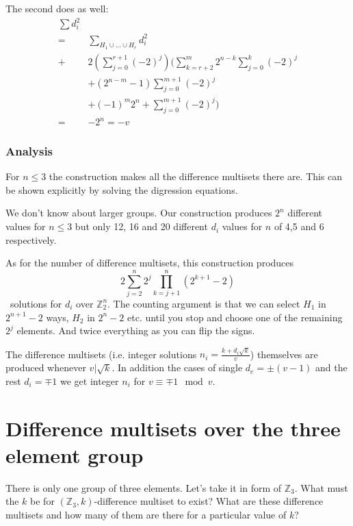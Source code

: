         The second does as well:
        \begin{equation}
            \begin{split}
                \sum d_i^2 & \\
                = & \sum\limits_{H_1 \cup \ldots \cup H_r} d_i^2 \\
                + & 2 \left(\sum\limits_{j=0}^{r+1} (-2)^j \right) 
                 \Bigg(
                    \sum\limits_{k=r+2}^{m} 2^{n-k} \sum\limits_{j=0}^k (-2)^j \\
                   & + (2^{n-m}-1)\sum\limits_{j=0}^{m+1} (-2)^j \\
                   & + (-1)^m 2^n + \sum\limits_{j=0}^{m+1} (-2)^j
                 \Bigg) \\
                = & - 2^n = -v
            \end{split}
        \end{equation}
    
    \subsubsection{Analysis}
        For $n \leq 3$ the construction makes all the difference multisets there are. This can be shown explicitly by solving the digression equations.
        
        We don't know about larger groups. Our construction produces $2^n$ different values for $n \leq 3$ but only 12, 16 and 20 different $d_i$ values for $n$ of 4,5 and 6 respectively.
        
        As for the number of difference multisets, this construction produces
        \begin{equation}
            2 \sum\limits_{j=2}^n 2^j \prod\limits_{k=j+1}^n (2^{k+1}-2)
        \end{equation}\
        solutions for $d_i$ over $\mathbb Z_2^n$. The counting argument is that we can select $H_1$ in $2^{n+1}-2$ ways, $H_2$ in $2^n-2$ etc. until you stop and choose one of the remaining $2^j$ elements. And twice everything as you can flip the signs.
        
        The difference multisets (i.e. integer solutions $n_i=\frac{k+d_i \sqrt k}v$) themselves are produced whenever $v | \sqrt k$. In addition the cases of single $d_e = \pm (v-1)$ and the rest $d_i = \mp 1$ we get integer $n_i$ for $v \equiv \mp 1 \mod v$.
        
\section{Difference multisets over the three element group}
    \label{sec:z3}
    There is only one group of three elements. Let's take it in form of $\mathbb Z_3$. What must the $k$ be for $(\mathbb Z_3,k)$-difference multiset to exist? What are these difference multisets and how many of them are there for a particular value of $k$?

